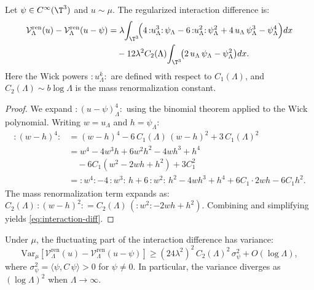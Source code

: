 \begin{proposition}
\label{prop:interaction-diff}
Let $\psi \in C^\infty(\T^3)$ and $u \sim \mu$. The regularized interaction
difference is:
\begin{align}
  \mathcal{V}_\Lambda^{\mathrm{ren}}(u) - \mathcal{V}_\Lambda^{\mathrm{ren}}(u-\psi)
  &= \lambda\!\int_{\T^3}\!\Bigl(
    4\,{:}u_\Lambda^3{:}\,\psi_\Lambda
    - 6\,{:}u_\Lambda^2{:}\,\psi_\Lambda^2
    + 4\,u_\Lambda\,\psi_\Lambda^3 - \psi_\Lambda^4
  \Bigr)dx \nonumber\\
  &\quad - 12\lambda^2 C_2(\Lambda)\!\int_{\T^3}\!\bigl(
    2\,u_\Lambda\,\psi_\Lambda - \psi_\Lambda^2\bigr)dx.
  \label{eq:interaction-diff}
\end{align}
Here the Wick powers ${:}u_\Lambda^k{:}$ are defined with respect to $C_1(\Lambda)$,
and $C_2(\Lambda) \sim b\log\Lambda$ is the mass renormalization constant.
\end{proposition}

\begin{proof}
We expand ${:}(u-\psi)_\Lambda^4{:}$ using the binomial theorem applied to
the Wick polynomial. Writing $w = u_\Lambda$ and $h = \psi_\Lambda$:
\begin{align*}
  {:(w-h)^4:} &= (w-h)^4 - 6\,C_1(\Lambda)\,(w-h)^2 + 3\,C_1(\Lambda)^2 \\
  &= w^4 - 4w^3h + 6w^2h^2 - 4wh^3 + h^4 \\
  &\quad - 6C_1(w^2 - 2wh + h^2) + 3C_1^2 \\
  &= {:}w^4{:} - 4\,{:}w^3{:}\,h + 6\,{:}w^2{:}\,h^2 - 4wh^3 + h^4
     + 6C_1\cdot 2wh - 6C_1 h^2.
\end{align*}
The mass renormalization term expands as:
$C_2(\Lambda)\,{:}(w-h)^2{:} = C_2(\Lambda)\,({:}w^2{:} - 2wh + h^2)$.
Combining and simplifying yields \eqref{eq:interaction-diff}.
\end{proof}

\begin{theorem}
\label{thm:variance-divergence}
Under $\mu$, the fluctuating part of the interaction difference has variance:
\begin{equation}\label{eq:var-divergence}
  \mathrm{Var}_\mu\!\left[
    \mathcal{V}_\Lambda^{\mathrm{ren}}(u) - \mathcal{V}_\Lambda^{\mathrm{ren}}(u-\psi)
  \right]
  \geq (24\lambda^2)^2\,C_2(\Lambda)^2\,\sigma_\psi^2 + O(\log\Lambda),
\end{equation}
where $\sigma_\psi^2 = \langle\psi, C\,\psi\rangle > 0$ for $\psi \neq 0$.
In particular, the variance diverges as $(\log\Lambda)^2$ when $\Lambda \to \infty$.
\end{theorem}


